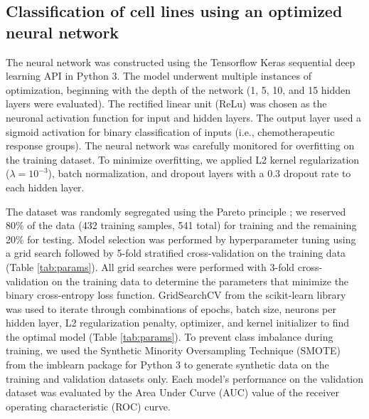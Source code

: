 \documentclass[10pt, letterpaper, twocolumn]{article}
\begin{document}
\subsection{Classification of cell lines using an optimized neural network}
The neural network was constructed using the Tensorflow Keras sequential deep learning API \cite{keras} in Python 3. The model underwent multiple instances of optimization, beginning with the depth of the network (1, 5, 10, and 15 hidden layers were evaluated). The rectified linear unit (ReLu) was chosen as the neuronal activation function for input and hidden layers. The output layer used a sigmoid activation for binary classification of inputs (i.e., chemotherapeutic response groups). The neural network was carefully monitored for overfitting on the training dataset. To minimize overfitting, we applied L2 kernel regularization ($\lambda=10^{-3}$), batch normalization, and dropout layers with a 0.3 dropout rate to each hidden layer.

The dataset was randomly segregated using the Pareto principle \cite{pareto}; we reserved 80\% of the data (432 training samples, 541 total) for training and the remaining 20\% for testing. Model selection was performed by hyperparameter tuning using a grid search followed by 5-fold stratified cross-validation on the training data (Table \ref{tab:params}). All grid searches were performed with 3-fold cross-validation on the training data to determine the parameters that minimize the binary cross-entropy loss function. GridSearchCV from the scikit-learn library \cite{scikit-learn} was used to iterate through combinations of epochs, batch size, neurons per hidden layer, L2 regularization penalty, optimizer, and kernel initializer to find the optimal model (Table \ref{tab:params}). To prevent class imbalance during training, we used the Synthetic Minority Oversampling Technique (SMOTE) from the imblearn package \cite{imblearn} for Python 3 to generate synthetic data on the training and validation datasets only. Each model’s performance on the validation dataset was evaluated by the Area Under Curve (AUC) value of the receiver operating characteristic (ROC) curve.
\end{document}
